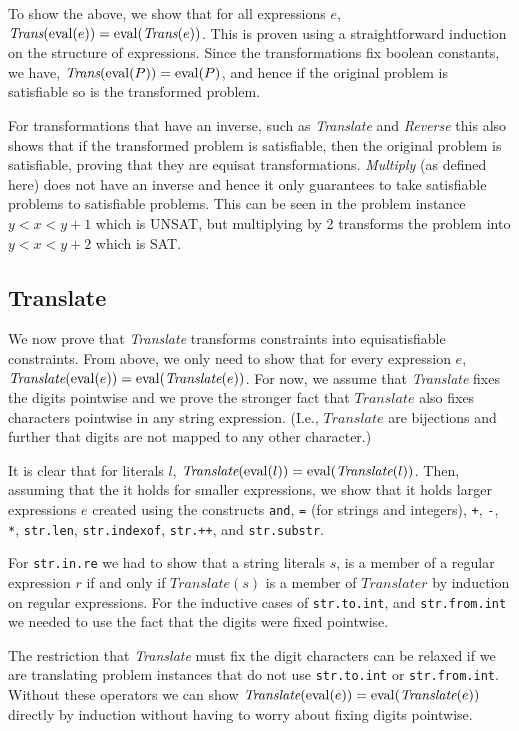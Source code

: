 To show the above, we show that for all expressions $e$,
$\textit{Trans}(\operatorname{eval} (e)) = \operatorname{eval} (\textit{Trans}(e))$. This is
proven using a straightforward induction on the structure of
expressions. Since the transformations fix boolean constants, we have,
$\textit{Trans}(\operatorname{eval} (P)) = \operatorname{eval} (P)$, and hence if the original
problem is satisfiable so is the transformed problem.

For transformations that have an inverse, such as \textit{Translate}
and \textit{Reverse} this also shows that if the transformed problem
is satisfiable, then the original problem is satisfiable, proving that
they are equisat transformations. \textit{Multiply} (as defined here)
does not have an inverse and hence it only guarantees to take
satisfiable problems to satisfiable problems. This can be seen in the
problem instance $y<x<y+1$ which is UNSAT, but multiplying by 2
transforms the problem into $y<x<y+2$ which is SAT.

\subsection{Translate}
We now prove that \textit{Translate} transforms constraints into
equisatisfiable constraints. From above, we only need to show that for
every expression $e$, $\textit{Translate}(\operatorname{eval} (e)) = \operatorname{eval}
(\textit{Translate}(e))$. For now, we assume that \textit{Translate}
fixes the digits pointwise and we prove the stronger fact that
$\textit{Translate}$ also fixes characters pointwise in any string
expression. (I.e., $\textit{Translate}$ are bijections and further
that digits are not mapped to any other character.)

It is clear that for literals $l$, $\textit{Translate}(\operatorname{eval} (l)) =
\operatorname{eval} (\textit{Translate}(l))$. Then, assuming that the it holds for
smaller expressions, we show that it holds larger expressions $e$
created using the constructs \texttt{and}, \texttt{=} (for strings and
integers), \texttt{+}, \texttt{-}, \texttt{*}, \texttt{str.len},
\texttt{str.indexof}, \texttt{str.++}, and \texttt{str.substr}.

For \texttt{str.in.re} we had to show that a string literals $s$, is a
member of a regular expression $r$ if and only if
$\textit{Translate}(s)$ is a member of $\textit{Translate}{r}$ by
induction on regular expressions. For the inductive cases of
\texttt{str.to.int}, and \texttt{str.from.int} we needed to use the
fact that the digits were fixed pointwise.

The restriction that \textit{Translate} must fix the digit characters
can be relaxed if we are translating problem instances that do not use
\texttt{str.to.int} or \texttt{str.from.int}. Without these operators
we can show $\textit{Translate}(\operatorname{eval} (e)) = \operatorname{eval}
(\textit{Translate}(e))$ directly by induction without having to worry
about fixing digits pointwise.

